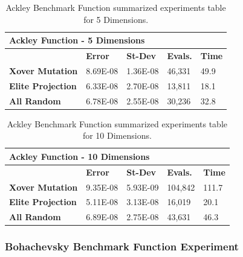 \documentclass[graybox]{svmult}
\begin{document}
            \begin{table}[]
                \scriptsize
                \centering
                \caption{Ackley Benchmark Function summarized experiments table for 5 Dimensions.}\label{tab.fun_ackley5}
                \begin{tabular}{@{}lllll@{}}
                \toprule
                \multicolumn{5}{l}{\textbf{Ackley Function - 5 Dimensions}} \\ \midrule
                & \textbf{Error} & \textbf{St-Dev} & \textbf{Evals.} & \textbf{Time} \\
                \textbf{Xover Mutation} & 8.69E-08 & 1.36E-08 & 46,331 & 49.9 \\
                \textbf{Elite Projection} & 6.33E-08 & 2.70E-08 & 13,811 & 18.1 \\
                \textbf{All Random} & 6.78E-08 & 2.55E-08 & 30,236 & 32.8 \\ \bottomrule
                \end{tabular}
                \end{table}

            \begin{table}[]
                \scriptsize
                \centering
                \caption{Ackley Benchmark Function summarized experiments table for 10 Dimensions.}\label{tab.fun_ackley10}
                \begin{tabular}{@{}lllll@{}}
                \toprule
                \multicolumn{5}{l}{\textbf{Ackley Function - 10 Dimensions}} \\ \midrule
                & \textbf{Error} & \textbf{St-Dev} & \textbf{Evals.} & \textbf{Time} \\
                \textbf{Xover Mutation} & 9.35E-08 & 5.93E-09 & 104,842 & 111.7 \\
                \textbf{Elite Projection} & 5.11E-08 & 3.13E-08 & 16,019 & 20.1 \\
                \textbf{All Random} & 6.89E-08 & 2.75E-08 & 43,631 & 46.3 \\ \bottomrule
                \end{tabular}
                \end{table}
            
            \FloatBarrier


        \subsubsection{Bohachevsky Benchmark Function Experiment}
\end{document}
